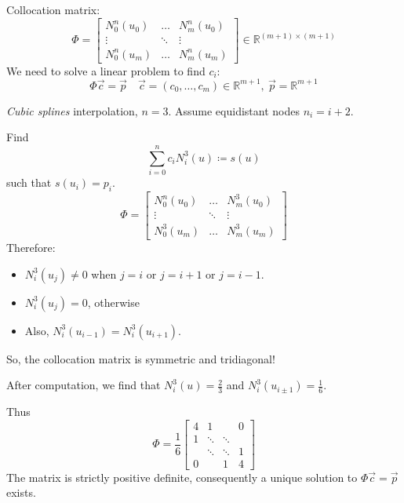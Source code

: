 Collocation matrix:
\[
    \Phi = \begin{bmatrix}
        N_0^n(u_0) & \dots & N_m^n(u_0)\\
        \vdots & \ddots & \vdots\\
        N_0^n(u_m) & \dots & N_m^n(u_m)
    \end{bmatrix}
    \in \mathbb{R}^{(m + 1) \times (m + 1)}
\]
We need to solve a linear problem to find $c_i$:
\[
    \Phi \vec{c} = \vec{p} \quad \vec{c} = (c_0, \dots, c_m) \in \mathbb{R}^{m+1},\
    \vec{p} = \mathbb{R}^{m+1}
\]
\begin{example}
    \textit{Cubic splines} interpolation, $n = 3$.
    Assume equidistant nodes $n_i = i + 2$.

    Find
    \[
        \sum_{i=0}^n c_i N_i^3(u) \coloneqq s(u)
    \]
    such that $s(u_i) = p_i$.
    \[
        \Phi = \begin{bmatrix}
            N_0^n(u_0) & \dots & N_m^3(u_0)\\
            \vdots & \ddots & \vdots\\
            N_0^3(u_m) & \dots & N_m^3(u_m)
        \end{bmatrix}
    \]
    Therefore:
    \begin{itemize}
        \item {
            $N_i^3(u_j) \ne 0$ when $j = i$ or $j = i + 1$ or $j = i - 1$.
        }
        \item {
            $N_i^3(u_j) = 0$, otherwise
        }
        \item {
            Also, $N_i^3(u_{i-1}) = N_i^3(u_{i+1})$.
        }
    \end{itemize}
    So, the collocation matrix is symmetric and tridiagonal!

    After computation, we find that
    $N_i^3(u) = \frac{2}{3}$ and $N_i^3(u_{i \pm 1}) = \frac{1}{6}$.

    Thus
    \[
        \Phi = \frac{1}{6}
        \begin{bmatrix}
            4 & 1 & & 0\\
            1 & \ddots & \ddots &\\
            & \ddots & \ddots & 1\\
            0 & & 1 & 4
        \end{bmatrix}
    \]
    The matrix is strictly positive definite, consequently a unique solution 
    to $\Phi \vec{c} = \vec{p}$ exists.
\end{example}

